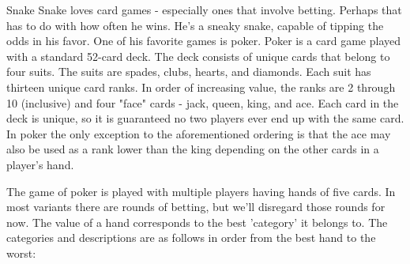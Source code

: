 \begin{problem}{Snake}
Snake loves card games - especially ones that involve betting. Perhaps that has to do with how often he wins. He's a sneaky snake, capable of tipping the odds in his favor. One of his favorite games is poker. Poker is a card game played with a standard 52-card deck. The deck consists of unique cards that belong to four suits. The suits are spades, clubs, hearts, and diamonds. Each suit has thirteen unique card ranks. In order of increasing value, the ranks are 2 through 10 (inclusive) and four "face" cards - jack, queen, king, and ace. Each card in the deck is unique, so it is guaranteed no two players ever end up with the same card. In poker the only exception to the aforementioned ordering is that the ace may also be used as a rank lower than the king depending on the other cards in a player's hand.

The game of poker is played with multiple players having hands of five cards. In most variants there are rounds of betting, but we'll disregard those rounds for now. The value of a hand corresponds to the best 'category' it belongs to. The categories and descriptions are as follows in order from the best hand to the worst:


\end{problem}
